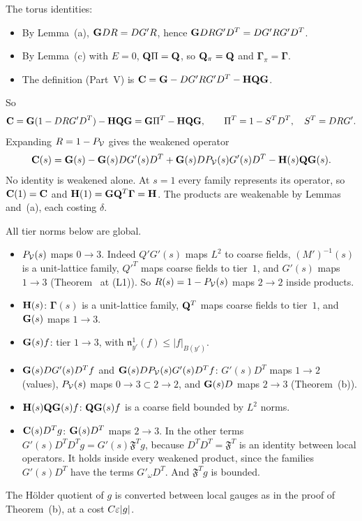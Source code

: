\begin{detail}\label{d9:C-identity}
The torus identities:
\begin{itemize}
\item By Lemma~(a), $\mathbf G DR=DG'R$, hence $\mathbf G DRG'D^T=DG'RG'D^T$.
\item By Lemma~(c) with $E=0$, $\mathbf Q\Pi=\mathbf Q$, so $\mathbf Q_\pi=\mathbf Q$ and $\boldsymbol\Gamma_\pi=\boldsymbol\Gamma$.
\item The definition (Part~V) is $\mathbf C=\mathbf G-DG'RG'D^T-\mathbf H\mathbf Q\mathbf G$.
\end{itemize}
So
\[
\mathbf C=\mathbf G(1-DRG'D^T)-\mathbf H\mathbf Q\mathbf G=\mathbf G\Pi^T-\mathbf H\mathbf Q\mathbf G,\qquad\Pi^T=1-S^TD^T,\quad S^T=DRG' .
\]
Expanding $R=1-P_\mathcal V$ gives the weakened operator
\[
\mathbf C(s)=\mathbf G(s)-\mathbf G(s)DG'(s)D^T+\mathbf G(s)DP_\mathcal V(s)G'(s)D^T-\mathbf H(s)\mathbf Q\mathbf G(s) .
\]
No identity is weakened alone. At $s=1$ every family represents its operator, so $\mathbf C(1)=\mathbf C$ and $\mathbf H(1)=\mathbf G\mathbf Q^T\boldsymbol\Gamma=\mathbf H$. The products are weakenable by Lemmas~ and~(a), each costing $\delta$.
\end{detail}

\begin{detail}\label{d9:HC}
All tier norms below are global.
\begin{itemize}
\item $P_\mathcal V(s)$ maps $0\to3$. Indeed $Q'G'(s)$ maps $L^2$ to coarse fields, $(M')^{-1}(s)$ is a unit-lattice family, $Q'^T$ maps coarse fields to tier~$1$, and $G'(s)$ maps $1\to3$ (Theorem~ at (L1)). So $R(s)=1-P_\mathcal V(s)$ maps $2\to2$ inside products.
\item $\mathbf H(s)$: $\boldsymbol\Gamma(s)$ is a unit-lattice family, $\mathbf Q^T$ maps coarse fields to tier~$1$, and $\mathbf G(s)$ maps $1\to3$.
\item $\mathbf G(s)f$: tier $1\to3$, with $\mathfrak n^1_{y'}(f)\le|f|_{B(y')}$.
\item $\mathbf G(s)DG'(s)D^Tf$ and $\mathbf G(s)DP_\mathcal V(s)G'(s)D^Tf$: $G'(s)D^T$ maps $1\to2$ (values), $P_\mathcal V(s)$ maps $0\to3\subset2\to2$, and $\mathbf G(s)D$ maps $2\to3$ (Theorem~(b)).
\item $\mathbf H(s)\mathbf Q\mathbf G(s)f$: $\mathbf Q\mathbf G(s)f$ is a coarse field bounded by $L^2$ norms.
\item $\mathbf C(s)D^Tg$: $\mathbf G(s)D^T$ maps $2\to3$. In the other terms $G'(s)D^TD^Tg=G'(s)\mathfrak F^Tg$, because $D^TD^T=\mathfrak F^T$ is an identity between local operators. It holds inside every weakened product, since the families $G'(s)D^T$ have the terms $G'_\omega D^T$. And $\mathfrak F^Tg$ is bounded.
\end{itemize}
The H\"older quotient of $g$ is converted between local gauges as in the proof of Theorem~(b), at a cost $C\varepsilon|g|$.
\end{detail}

